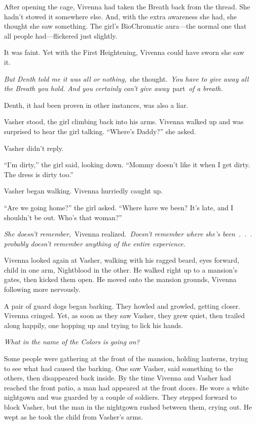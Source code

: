 After opening the cage, Vivenna had taken the Breath back from the thread. She hadn’t stowed it somewhere else. And, with the extra awareness she had, she thought she saw something. The girl’s BioChromatic aura—the normal one that all people had—flickered just slightly.

It was faint. Yet with the First Heightening, Vivenna could have sworn she saw it.

\textit{But Denth told me it was all or nothing,}~she thought.~\textit{You have to give away all the Breath you hold. And you certainly can’t give away}~part~\textit{of a breath.}

Denth, it had been proven in other instances, was also a liar.

Vasher stood, the girl climbing back into his arms. Vivenna walked up and was surprised to hear the girl talking. “Where’s Daddy?” she asked.

Vasher didn’t reply.

“I’m dirty,” the girl said, looking down. “Mommy doesn’t like it when I get dirty. The dress is dirty too.”

Vasher began walking. Vivenna hurriedly caught up.

“Are we going home?” the girl asked. “Where have we been? It’s late, and I shouldn’t be out. Who’s that woman?”

\textit{She doesn’t remember,}~Vivenna realized.~\textit{Doesn’t remember where she’s been~.~.~. probably doesn’t remember anything of the entire experience.}

Vivenna looked again at Vasher, walking with his ragged beard, eyes forward, child in one arm, Nightblood in the other. He walked right up to a mansion’s gates, then kicked them open. He moved onto the mansion grounds, Vivenna following more nervously.

A pair of guard dogs began barking. They howled and growled, getting closer. Vivenna cringed. Yet, as soon as they saw Vasher, they grew quiet, then trailed along happily, one hopping up and trying to lick his hands.

\textit{What in the name of the Colors is going on?}

Some people were gathering at the front of the mansion, holding lanterns, trying to see what had caused the barking. One saw Vasher, said something to the others, then disappeared back inside. By the time Vivenna and Vasher had reached the front patio, a man had appeared at the front doors. He wore a white nightgown and was guarded by a couple of soldiers. They stepped forward to block Vasher, but the man in the nightgown rushed between them, crying out. He wept as he took the child from Vasher’s arms.

